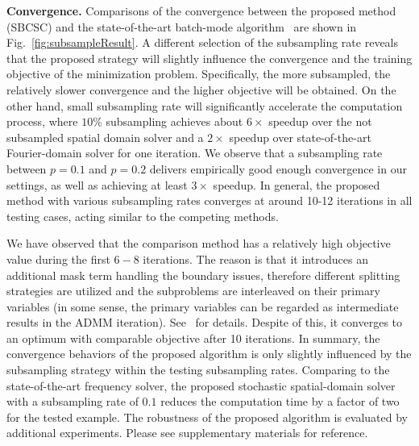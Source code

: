 {\bfseries Convergence.} Comparisons of the convergence between the
proposed method (SBCSC) and the state-of-the-art batch-mode
algorithm~\cite{heide2015fast} are shown in
Fig.~\ref{fig:subsampleResult}. A different selection of the
subsampling rate reveals that the proposed strategy will slightly
influence the convergence and the training objective of the
minimization problem. Specifically, the more subsampled, the
relatively slower convergence and the higher objective will be
obtained. On the other hand, small subsampling rate will significantly
accelerate the computation process, where $10\%$ subsampling achieves
about $6 \times$ speedup over the not subsampled spatial domain solver
and a $2 \times$ speedup over state-of-the-art Fourier-domain solver
for one iteration. We observe that a subsampling rate between $p=0.1$
and $p=0.2$ delivers empirically good enough convergence in our
settings, as well as achieving at least $3 \times$ speedup. In
general, the proposed method with various subsampling rates converges
at around 10-12 iterations in all testing cases, acting similar to the
competing methods.

We have observed that the comparison method has a relatively
high objective value during the first $6-8$ iterations. The reason is that it introduces an additional mask term handling the boundary issues, therefore different splitting strategies are utilized and the subproblems are
interleaved on their primary variables (in some sense, the primary variables can be regarded as intermediate results in the ADMM iteration). See~\cite{wohlberg2016efficient} for details. Despite of this, it converges to an optimum with comparable objective after 10 iterations. In summary, the convergence behaviors of the proposed
algorithm is only slightly influenced by the subsampling strategy
within the testing subsampling rates. Comparing to the
state-of-the-art frequency solver, the proposed stochastic
spatial-domain solver with a subsampling rate of $0.1$ reduces the
computation time by a factor of two for the tested example. The
robustness of the proposed algorithm is evaluated by additional
experiments. Please see supplementary materials for reference.


